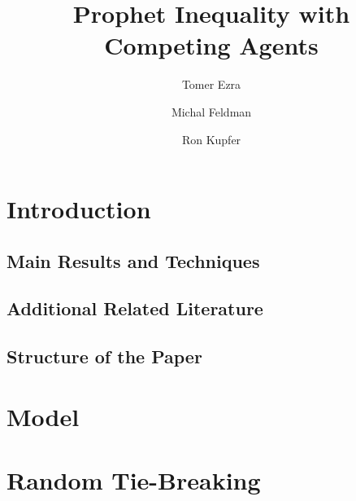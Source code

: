\documentclass[runningheads]{llncs}
\begin{document}
%
\title{Prophet Inequality with Competing Agents}
%
%
\author{Tomer Ezra \and
Michal Feldman \and
Ron Kupfer}

%

\maketitle              %
%
\begin{abstract}


\end{abstract}
%
%
%
	\section{Introduction}
\label{sec:intro}

\subsection{Main Results and Techniques}
\label{sec:results}

%
\subsection{Additional Related Literature}

\subsection{Structure of the Paper}

\section{Model	}
\label{sec:model}


%
\section{Random Tie-Breaking}
\label{sec:prophet_random}

\end{document}
